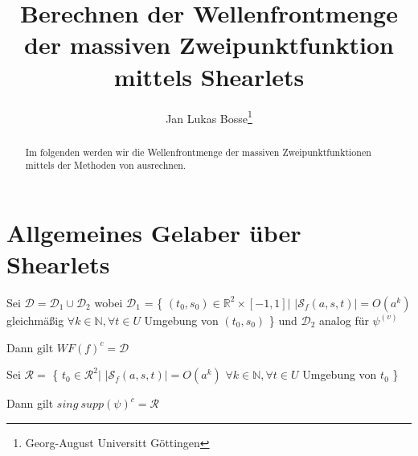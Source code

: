 \documentclass{scrartcl}
\title{Berechnen der Wellenfrontmenge der massiven Zweipunktfunktion mittels Shearlets}
\author{Jan Lukas Bosse\thanks{
                  Georg-August Universitt Göttingen}
        }
\begin{document}
\newpage
\maketitle
\begin{abstract}
    Im folgenden werden wir die Wellenfrontmenge der massiven Zweipunktfunktionen
    mittels der Methoden von \textcite{Kutyniok2008} ausrechnen.
\end{abstract}




\section{Allgemeines Gelaber über Shearlets} %
\label{sec:allgemeines_gelaber_ueber_shearlets}

\begin{theorem}
\label{thm:main_theorem}
    Sei $\mathcal{D} = \mathcal{D}_1 \cup \mathcal{D}_2$ wobei
    $\mathcal{D}_1$ = \{
        $(t_0, s_0) \in \mathbb{R}^2 \times [-1,1] \big|$
        $|\mathcal{S}_f (a, s, t)| = O(a^k)$ gleichmäßig $\forall k \in \mathbb{N}
        , \forall t \in U$ Umgebung von $(t_0, s_0)$
    \}
    und $\mathcal{D}_2$ analog für $\psi^{(v)}$

    Dann gilt $WF(f)^c = \mathcal{D}$
\end{theorem}


\begin{corollary}
Sei $\mathcal{R} =$ \{
    $t_0 \in \mathcal{R}^2 \big|$ $|\mathcal{S}_f(a,s,t)| = O(a^k)$
    $\forall k \in \mathbb{N}, \forall t \in U$ Umgebung von $t_0$
    \}

    Dann gilt $sing ~supp (\psi)^c = \mathcal{R}$
\end{corollary}
\end{document}
